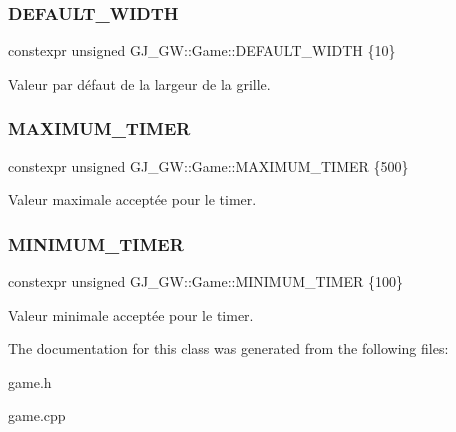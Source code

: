 \subsubsection{\texorpdfstring{D\+E\+F\+A\+U\+L\+T\+\_\+\+W\+I\+D\+TH}{DEFAULT\_WIDTH}}
{\footnotesize\ttfamily constexpr unsigned G\+J\+\_\+\+G\+W\+::\+Game\+::\+D\+E\+F\+A\+U\+L\+T\+\_\+\+W\+I\+D\+TH \{10\}\hspace{0.3cm}{\ttfamily [static]}}

Valeur par défaut de la largeur de la grille. \hypertarget{class_g_j___g_w_1_1_game_a32cb03f34e9e7a56ff3d99e075d71de7}{}\label{class_g_j___g_w_1_1_game_a32cb03f34e9e7a56ff3d99e075d71de7} 
\subsubsection{\texorpdfstring{M\+A\+X\+I\+M\+U\+M\+\_\+\+T\+I\+M\+ER}{MAXIMUM\_TIMER}}
{\footnotesize\ttfamily constexpr unsigned G\+J\+\_\+\+G\+W\+::\+Game\+::\+M\+A\+X\+I\+M\+U\+M\+\_\+\+T\+I\+M\+ER \{500\}\hspace{0.3cm}{\ttfamily [static]}}

Valeur maximale acceptée pour le timer. \hypertarget{class_g_j___g_w_1_1_game_a4f6cc808814a6884659f89dae6a7b150}{}\label{class_g_j___g_w_1_1_game_a4f6cc808814a6884659f89dae6a7b150} 
\subsubsection{\texorpdfstring{M\+I\+N\+I\+M\+U\+M\+\_\+\+T\+I\+M\+ER}{MINIMUM\_TIMER}}
{\footnotesize\ttfamily constexpr unsigned G\+J\+\_\+\+G\+W\+::\+Game\+::\+M\+I\+N\+I\+M\+U\+M\+\_\+\+T\+I\+M\+ER \{100\}\hspace{0.3cm}{\ttfamily [static]}}

Valeur minimale acceptée pour le timer. 

The documentation for this class was generated from the following files\+:\begin{DoxyCompactItemize}
\item 
game.\+h\item 
game.\+cpp\end{DoxyCompactItemize}
